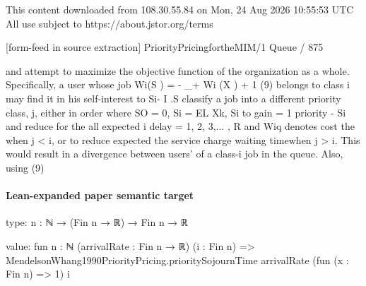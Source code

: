 \documentclass[10pt]{article}
\begin{document}
\begin{ReviewVerbatim}
                                                  This content downloaded from
                                108.30.55.84 on Mon, 24 Aug 2026 10:55:53 UTC
                                          All use subject to https://about.jstor.org/terms

[form-feed in source extraction]
                                                                                  PriorityPricingfortheMIM/1 Queue / 875

and                                                                   attempt to maximize the objective function of the
                                                                      organization as a whole. Specifically, a user whose job
 Wi(S ) = - _+ Wi (X ) + 1 (9)                                        belongs to class i may find it in his self-interest to
           Si- I .S
                                                                       classify a job into a different priority class, j, either in
                         order
 where SO = 0, Si = EL Xk,  Si to gain
                                  = 1  priority
                                           - Si and reduce
                                                     for   the all
                                                               expected
                                                                     i delay
                                                                        = 1,
2, 3,... , R and Wiq denotes cost
                              the   when  j < i, or to reduce
                                       expected               the service charge
                                                            waiting          timewhen
                             j > i. This would result in a divergence between users'
of a class-i job in the queue. Also, using (9)
\end{ReviewVerbatim}



\paragraph{Lean-expanded paper semantic target}
\begin{ReviewVerbatim}
type:
{n : ℕ} → (Fin n → ℝ) → Fin n → ℝ

value:
fun {n : ℕ} (arrivalRate : Fin n → ℝ) (i : Fin n) =>
  MendelsonWhang1990PriorityPricing.prioritySojournTime arrivalRate (fun (x : Fin n) => 1) i
\end{ReviewVerbatim}
\end{document}
